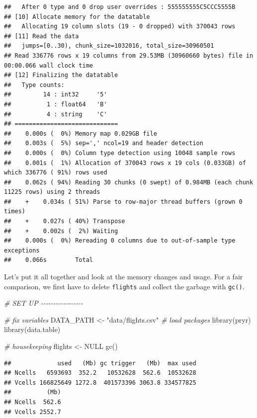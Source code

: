 \documentclass[
  12pt,
]{style/krantz}
\newenvironment{Shaded}{\begin{snugshade}}{\end{snugshade}}
\newcommand{\CommentTok}[1]{\textcolor[rgb]{0.56,0.35,0.01}{\textit{#1}}}
\newcommand{\ConstantTok}[1]{\textcolor[rgb]{0.00,0.00,0.00}{#1}}
\newcommand{\FunctionTok}[1]{\textcolor[rgb]{0.00,0.00,0.00}{#1}}
\newcommand{\NormalTok}[1]{#1}
\newcommand{\OtherTok}[1]{\textcolor[rgb]{0.56,0.35,0.01}{#1}}
\newcommand{\StringTok}[1]{\textcolor[rgb]{0.31,0.60,0.02}{#1}}
\begin{document}
\begin{verbatim}
##   After 0 type and 0 drop user overrides : 555555555C5CCC5555B
## [10] Allocate memory for the datatable
##   Allocating 19 column slots (19 - 0 dropped) with 370043 rows
## [11] Read the data
##   jumps=[0..30), chunk_size=1032016, total_size=30960501
## Read 336776 rows x 19 columns from 29.53MB (30960660 bytes) file in 00:00.066 wall clock time
## [12] Finalizing the datatable
##   Type counts:
##         14 : int32     '5'
##          1 : float64   'B'
##          4 : string    'C'
## =============================
##    0.000s (  0%) Memory map 0.029GB file
##    0.003s (  5%) sep=',' ncol=19 and header detection
##    0.000s (  0%) Column type detection using 10048 sample rows
##    0.001s (  1%) Allocation of 370043 rows x 19 cols (0.033GB) of which 336776 ( 91%) rows used
##    0.062s ( 94%) Reading 30 chunks (0 swept) of 0.984MB (each chunk 11225 rows) using 2 threads
##    +    0.034s ( 51%) Parse to row-major thread buffers (grown 0 times)
##    +    0.027s ( 40%) Transpose
##    +    0.002s (  2%) Waiting
##    0.000s (  0%) Rereading 0 columns due to out-of-sample type exceptions
##    0.066s        Total
\end{verbatim}

Let's put it all together and look at the memory changes and usage. For a fair comparison, we first have to delete \texttt{flights} and collect the garbage with \texttt{gc()}.

\begin{Shaded}
\begin{Highlighting}[]
\CommentTok{\# SET UP {-}{-}{-}{-}{-}{-}{-}{-}{-}{-}{-}{-}{-}{-}{-}{-}{-}}

\CommentTok{\# fix variables}
\NormalTok{DATA\_PATH }\OtherTok{\textless{}{-}} \StringTok{"data/flights.csv"}
\CommentTok{\# load packages}
\FunctionTok{library}\NormalTok{(pryr) }
\FunctionTok{library}\NormalTok{(data.table)}

\CommentTok{\# housekeeping}
\NormalTok{flights }\OtherTok{\textless{}{-}} \ConstantTok{NULL}
\FunctionTok{gc}\NormalTok{()}
\end{Highlighting}
\end{Shaded}

\begin{verbatim}
##             used   (Mb) gc trigger   (Mb)  max used
## Ncells   6593693  352.2   10532628  562.6  10532628
## Vcells 166825649 1272.8  401573396 3063.8 334577825
##          (Mb)
## Ncells  562.6
## Vcells 2552.7
\end{verbatim}
\end{document}
